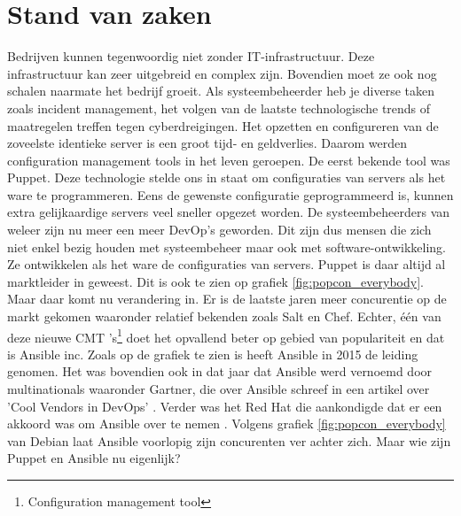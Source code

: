 \section{Stand van zaken}
\label{sec:stand-van-zaken}
Bedrijven kunnen tegenwoordig niet zonder IT-infrastructuur. Deze infrastructuur kan zeer uitgebreid en complex zijn. Bovendien moet ze ook nog schalen naarmate het bedrijf groeit. Als systeembeheerder heb je diverse taken zoals incident management, 
het volgen van de laatste technologische trends of maatregelen treffen tegen cyberdreigingen. Het opzetten en configureren van de zoveelste identieke server is een groot tijd- en geldverlies. Daarom werden configuration management tools in het leven geroepen. De eerst bekende tool was Puppet. Deze technologie stelde ons in staat om configuraties van servers als het ware te programmeren. Eens de gewenste configuratie geprogrammeerd is, kunnen extra gelijkaardige servers veel sneller opgezet worden. De systeembeheerders van weleer zijn nu meer een meer DevOp's geworden. Dit zijn dus mensen die zich niet enkel bezig houden met systeembeheer maar ook met software-ontwikkeling. Ze ontwikkelen als het ware de configuraties van servers. Puppet is daar altijd al marktleider in geweest. Dit is ook te zien op grafiek \ref{fig:popcon_everybody}. Maar daar komt nu verandering in. Er is de laatste jaren meer concurentie op de markt gekomen waaronder relatief bekenden zoals Salt en Chef. 
Echter,  \'e\'en van deze nieuwe CMT 's\footnote{Configuration management tool} doet het opvallend beter op gebied van populariteit en dat is Ansible inc. Zoals op de grafiek te zien is heeft Ansible in 2015 de leiding genomen. Het was bovendien ook in dat jaar dat Ansible werd vernoemd door multinationals waaronder Gartner, die over Ansible schreef in een artikel over  'Cool Vendors in DevOps' \autocite{coolvendors}. Verder was het Red Hat die aankondigde dat er een akkoord was om Ansible over te nemen \autocite{redhatovername}. Volgens grafiek  \ref{fig:popcon_everybody} van Debian laat Ansible voorlopig zijn concurenten ver achter zich. Maar wie zijn Puppet en Ansible nu eigenlijk?

